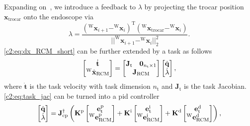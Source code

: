 Expanding on~\cite{aghakhani2013task}, we introduce a feedback to $\lambda$ by projecting the trocar position $\mathbf{x}_\text{trocar}$ onto the endoscope via
\begin{equation}
    \lambda = \frac{(^\text{W}\mathbf{x}_{i+1} - ^\text{W}\mathbf{x}_i)^\text{T}(^\text{W}\mathbf{x}_\text{trocar}-^\text{W}\mathbf{x}_i)}{||^\text{W}\mathbf{x}_{i+1}-^\text{W}\mathbf{x}_i||_2^2}.
\end{equation}
\eqref{c2:eq:dx_RCM_short} can be further extended by a task as follows
\begin{equation}
    \begin{bmatrix}\dot{\mathbf{t}} \\ ^\text{W}\dot{\mathbf{x}}_\text{RCM}\end{bmatrix} =
    \begin{bmatrix}\mathbf{J}_\text{t} & \mathbf{0}_{n_\text{t}\times 1} \\ \multicolumn{2}{c}{\mathbf{J}_\text{RCM}}
    \end{bmatrix}
    \begin{bmatrix}\dot{\mathbf{q}}\\\dot{\lambda}\end{bmatrix},
    \label{c2:eq:task_jac}
\end{equation}
where $\dot{\mathbf{t}}$ is the task velocity with task dimension $n_\text{t}$ and $\mathbf{J}_\text{t}$ is the task Jacobian. \eqref{c2:eq:task_jac} can be turned into a \gls{pid} controller
\begin{equation}
    \centering
    \begin{bmatrix}
        \dot{\mathbf{q}}\\
        \dot{\lambda}
    \end{bmatrix} = 
    \mathbf{J}_\text{cp}^{\dagger}
    \left(
        \mathbf{K}^\text{p}
        \begin{bmatrix}
            \mathbf{e}_\text{t}^\text{p}\\
            ^\text{W}\mathbf{e}_\text{RCM}^\text{p}
        \end{bmatrix} +
        \mathbf{K}^\text{i}
        \begin{bmatrix}
            \mathbf{e}_\text{t}^\text{i}\\
            ^\text{W}\mathbf{e}_\text{RCM}^\text{i}
        \end{bmatrix} +
        \mathbf{K}^\text{d}
        \begin{bmatrix}
            \mathbf{e}_\text{t}^\text{d}\\
            ^\text{W}\mathbf{e}_\text{RCM}^\text{d}
        \end{bmatrix}
    \right),
    \label{c2:eq:pid}
\end{equation}

